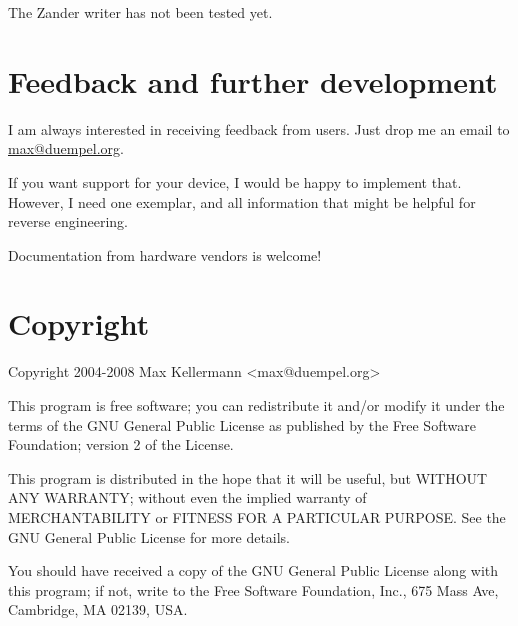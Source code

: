 \documentclass{article}
\begin{document}
The Zander writer has not been tested yet.


\section{Feedback and further development}

I am always interested in receiving feedback from users.  Just drop me
an email to \href{mailto:max@duempel.org}{max@duempel.org}.

If you want support for your device, I would be happy to implement
that.  However, I need one exemplar, and all information that might be
helpful for reverse engineering.

Documentation from hardware vendors is welcome!


\section{Copyright}

Copyright 2004-2008 Max Kellermann <max@duempel.org>

This program is free software; you can redistribute it and/or modify
it under the terms of the GNU General Public License as published by
the Free Software Foundation; version 2 of the License.

This program is distributed in the hope that it will be useful, but
WITHOUT ANY WARRANTY; without even the implied warranty of
MERCHANTABILITY or FITNESS FOR A PARTICULAR PURPOSE.  See the GNU
General Public License for more details.

You should have received a copy of the GNU General Public License
along with this program; if not, write to the Free Software
Foundation, Inc., 675 Mass Ave, Cambridge, MA 02139, USA.
\end{document}
